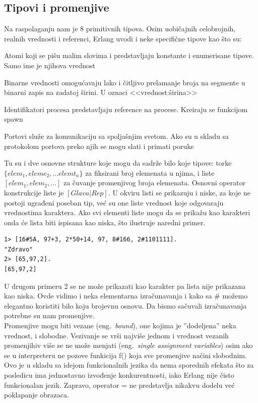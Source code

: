 \documentclass[a4paper]{article}
\begin{document}
{\subsection{Tipovi i promenjive}
Na raspolaganju nam je 8 primitivnih tipova. 
Osim uobičajnih celobrojnih, realnih vrednosti i referenci, Erlang uvodi i neke specifične tipove kao što su:

\begin{list}{•}{}
\item Atomi koji se pišu malim slovima i predstavljaju konstante i enumerisane tipove. Samo ime je njihova vrednost
\item Binarne vrednosti omogućavaju lako i čitljivo prelamanje broja na segmente u binarni zapis na zadatoj širini. U oznaci <<vrednost:širina>>
\item Identifikatori procesa predstavljaju reference na procese. Kreiraju se funkcijom spawn
\item Portovi služe za komunikaciju sa spoljašnjim svetom. Ako su u skladu sa protokolom portova preko njih se mogu slati i primati poruke
\end{list}
 
Tu su i dve osnovne strukture koje mogu da sadrže bilo koje tipove: torke $\{elem_1, eleme_2, ... elemt_n\}$ za fiksirani broj elemenata u njima, 
i liste $[elem_1, elem_2, ...]$ za čuvanje promenjivog broja elemenata. 
Osnovni operator konstrukcije liste je $[Glava | Rep]$. 
U okviru listi se prikazuju i niske, za koje ne postoji ugrađeni poseban tip, 
već su one liste vrednost koje odgovaraju vrednostima karaktera. Ako svi elementi liste mogu da se prikažu kao karakteri onda će lista biti ispisana kao niska, što ilustruje naredni primer.
\begin{verbatim}
1> [16#5A, 97+3, 2*50+14, 97, 8#166, 2#1101111].
"Zdravo"
2> [65,97,2].
[65,97,2]
\end{verbatim}
U drugom primeru 2 se ne može prikazati kao karakter pa lista nije prikazana kao niska. 
Ovde vidimo i neka elementarna izračunavanja i kako sa \# možemo elegantno koristiti bilo koju brojevnu osnovu. Da bismo sačuvali izračunavanja potrebne su nam promenjive.\\

Promenjive mogu biti vezane (eng.~{\em bound}), one kojima je ''dodeljena'' neka vrednost, i slobodne. 
Vezivanje se vrši najviše jednom i vrednost vezanih promenjihiv više se ne može menjati (eng.~{\em single assignment variables}) osim ako se u interpreteru ne pozove funkicija f() koja sve promenjive načini slobodnim. 
Ovo je u skladu sa idejom funkcionalnih jezika da nema sporednih efekata što za posledicu ima jednostavno izvođenje konkurentnosti, iako Erlang nije čisto funkcionalan jezik.
Zapravo, operator = ne predstavlja nikakvu dodelu već poklapanje obrazaca.


}
\end{document}
